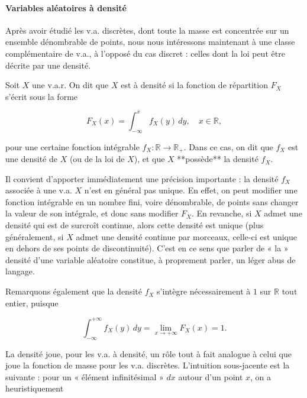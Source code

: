 \paragraph{Variables aléatoires à densité}

Après avoir étudié les v.a. discrètes, dont toute la masse est concentrée sur un ensemble dénombrable de points, nous nous intéressons maintenant à une classe complémentaire de v.a., à l'opposé du cas discret : celles dont la loi peut être décrite par une densité.

\medskip

\begin{mdframed}
\begin{definition}
Soit $X$ une v.a.r. On dit que $X$ est à densité si la fonction de répartition $F_X$ s'écrit sous la forme

\begin{equation}\label{1.1}
F_X(x) = \int_{-\infty}^x f_X(y)\, dy, \quad x \in \mathbb{R},
\end{equation}

pour une certaine fonction intégrable $f_X : \mathbb{R} \to \mathbb{R}_+$. Dans ce cas, on dit que $f_X$ est une densité de $X$ (ou de la loi de $X$), et que $X$ **possède** la densité $f_X$.
\end{definition}
\end{mdframed}

Il convient d'apporter immédiatement une précision importante : la densité $f_X$ associée à une v.a. $X$ n'est en général pas unique. En effet, on peut modifier une fonction intégrable en un nombre fini, voire dénombrable, de points sans changer la valeur de son intégrale, et donc sans modifier $F_X$. En revanche, si $X$ admet une densité qui est de surcroît continue, alors cette densité est unique (plus généralement, si $X$ admet une densité continue par morceaux, celle-ci est unique en dehors de ses points de discontinuité). C'est en ce sens que parler de « la » densité d'une variable aléatoire constitue, à proprement parler, un léger abus de langage.

Remarquons également que la densité $f_X$ s'intègre nécessairement à $1$ sur $\mathbb{R}$ tout entier, puisque

$$
\int_{-\infty}^{+\infty} f_X(y)\, dy = \lim_{x \to +\infty} F_X(x) = 1.
$$

La densité joue, pour les v.a. à densité, un rôle tout à fait analogue à celui que joue la fonction de masse pour les v.a. discrètes. L'intuition sous-jacente est la suivante : pour un « élément infinitésimal » $dx$ autour d'un point $x$, on a heuristiquement

